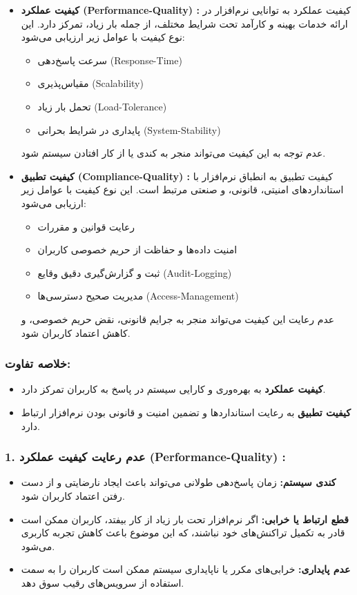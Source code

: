 \begin{itemize}
	\item \textbf{کیفیت عملکرد (Performance-Quality) :}
	کیفیت عملکرد به توانایی نرم‌افزار در ارائه خدمات بهینه و کارآمد تحت شرایط مختلف، از جمله بار زیاد، تمرکز دارد. این نوع کیفیت با عوامل زیر ارزیابی می‌شود:
	\begin{itemize}
		\item سرعت پاسخ‌دهی (Response-Time)
		\item مقیاس‌پذیری (Scalability)
		\item تحمل بار زیاد (Load-Tolerance)
		\item پایداری در شرایط بحرانی (System-Stability)
	\end{itemize}
	عدم توجه به این کیفیت می‌تواند منجر به کندی یا از کار افتادن سیستم شود.
	
	\item \textbf{کیفیت تطبیق (Compliance-Quality) :}
	کیفیت تطبیق به انطباق نرم‌افزار با استانداردهای امنیتی، قانونی، و صنعتی مرتبط است. این نوع کیفیت با عوامل زیر ارزیابی می‌شود:
	\begin{itemize}
		\item رعایت قوانین و مقررات
		\item امنیت داده‌ها و حفاظت از حریم خصوصی کاربران
		\item ثبت و گزارش‌گیری دقیق وقایع (Audit-Logging)
		\item مدیریت صحیح دسترسی‌ها (Access-Management)
	\end{itemize}
	عدم رعایت این کیفیت می‌تواند منجر به جرایم قانونی، نقض حریم خصوصی، و کاهش اعتماد کاربران شود.
\end{itemize}

\subsubsection*{خلاصه تفاوت:}
\begin{itemize}
	\item \textbf{کیفیت عملکرد} به بهره‌وری و کارایی سیستم در پاسخ به کاربران تمرکز دارد.
	\item \textbf{کیفیت تطبیق} به رعایت استانداردها و تضمین امنیت و قانونی بودن نرم‌افزار ارتباط دارد.
\end{itemize}



\subsubsection*{1. عدم رعایت کیفیت عملکرد (Performance-Quality) :}
\begin{itemize}
	\item \textbf{کندی سیستم:} زمان پاسخ‌دهی طولانی می‌تواند باعث ایجاد نارضایتی و از دست رفتن اعتماد کاربران شود.
	\item \textbf{قطع ارتباط یا خرابی:} اگر نرم‌افزار تحت بار زیاد از کار بیفتد، کاربران ممکن است قادر به تکمیل تراکنش‌های خود نباشند، که این موضوع باعث کاهش تجربه کاربری می‌شود.
	\item \textbf{عدم پایداری:} خرابی‌های مکرر یا ناپایداری سیستم ممکن است کاربران را به سمت استفاده از سرویس‌های رقیب سوق دهد.
\end{itemize}


